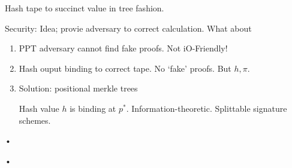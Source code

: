 \begin{enumerate}
Hash tape to succinct value in tree fashion.

Security: Idea; provie adversary to correct calculation. What about 
\begin{enumerate}
\item
PPT adversary cannot find fake proofs. Not iO-Friendly!
\item
Hash ouput binding to correct tape. No `fake' proofs. But $h,\pi$.
\item Solution: positional merkle trees

Hash value $h$ is binding at $p^*$. Information-theoretic. Splittable signature schemes.
\end{enumerate}•


\end{enumerate}•